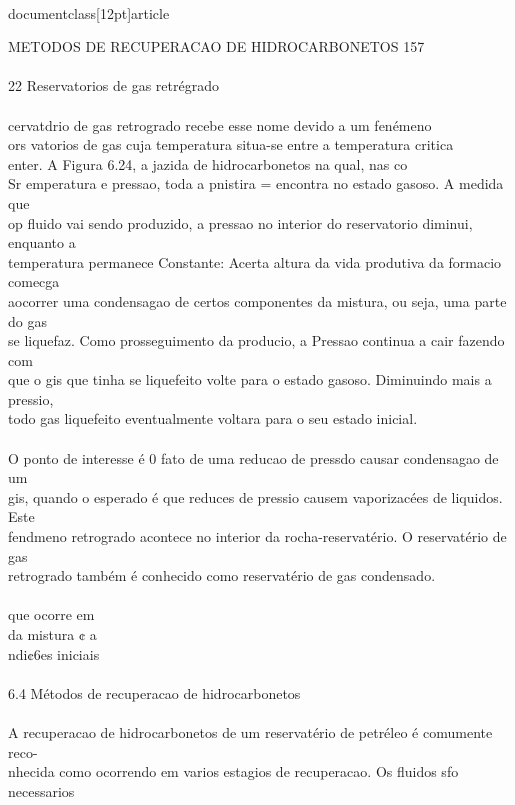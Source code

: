 \\documentclass[12pt]{article}
\begin{document}
METODOS DE RECUPERACAO DE HIDROCARBONETOS 157\\
\\
22 Reservatorios de gas retrégrado\\
\\
cervatdrio de gas retrogrado recebe esse nome devido a um fenémeno\\
ors vatorios de gas cuja temperatura situa-se entre a temperatura critica\\
enter. A Figura 6.24, a jazida de hidrocarbonetos na qual, nas co\\
Sr emperatura e pressao, toda a pnistira = encontra no estado gasoso. A medida que\\
op fluido vai sendo produzido, a pressao no interior do reservatorio diminui, enquanto a\\
temperatura permanece Constante: Acerta altura da vida produtiva da formacio comecga\\
aocorrer uma condensagao de certos componentes da mistura, ou seja, uma parte do gas\\
se liquefaz. Como prosseguimento da producio, a Pressao continua a cair fazendo com\\
que o gis que tinha se liquefeito volte para o estado gasoso. Diminuindo mais a pressio,\\
todo gas liquefeito eventualmente voltara para o seu estado inicial.\\
\\
O ponto de interesse é 0 fato de uma reducao de pressdo causar condensagao de um\\
gis, quando o esperado é que reduces de pressio causem vaporizacées de liquidos. Este\\
fendmeno retrogrado acontece no interior da rocha-reservatério. O reservatério de gas\\
retrogrado também é conhecido como reservatério de gas condensado.\\
\\
que ocorre em\\
da mistura ¢ a\\
ndi¢6es iniciais\\
\\
6.4 Métodos de recuperacao de hidrocarbonetos\\
\\
A recuperacao de hidrocarbonetos de um reservatério de petréleo é comumente reco-\\
nhecida como ocorrendo em varios estagios de recuperacao. Os fluidos sfo necessarios\\
\end{document}
